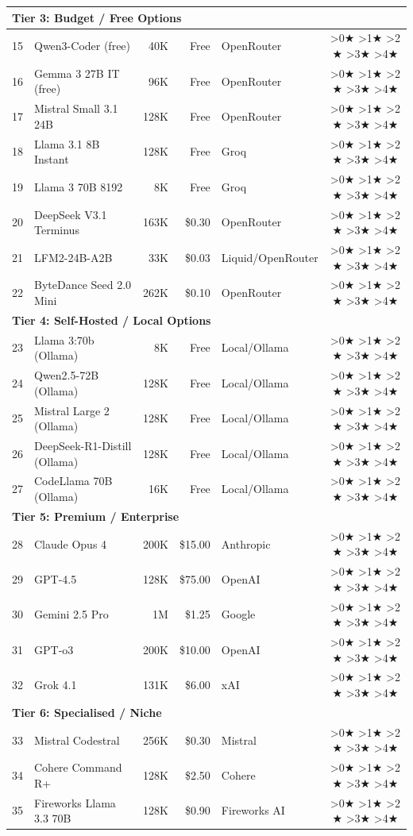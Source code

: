 \documentclass[12pt,a4paper]{report}
\newcommand{\stars}[1]{%
  \ifnum#1>0\relax\ensuremath{\bigstar}\fi%
  \ifnum#1>1\relax\ensuremath{\bigstar}\fi%
  \ifnum#1>2\relax\ensuremath{\bigstar}\fi%
  \ifnum#1>3\relax\ensuremath{\bigstar}\fi%
  \ifnum#1>4\relax\ensuremath{\bigstar}\fi%
}
\begin{document}
\begin{longtable}{rlrrp{3cm}c}
\multicolumn{6}{l}{\textbf{Tier 3: Budget / Free Options}} \\
\midrule
15 & Qwen3-Coder (free)         & 40K    & Free    & OpenRouter       & \stars{3} \\
16 & Gemma 3 27B IT (free)      & 96K    & Free    & OpenRouter       & \stars{3} \\
17 & Mistral Small 3.1 24B      & 128K   & Free    & OpenRouter       & \stars{3} \\
18 & Llama 3.1 8B Instant       & 128K   & Free    & Groq             & \stars{2} \\
19 & Llama 3 70B 8192           & 8K     & Free    & Groq             & \stars{2} \\
20 & DeepSeek V3.1 Terminus     & 163K   & \$0.30  & OpenRouter       & \stars{3} \\
21 & LFM2-24B-A2B               & 33K    & \$0.03  & Liquid/OpenRouter& \stars{2} \\
22 & ByteDance Seed 2.0 Mini    & 262K   & \$0.10  & OpenRouter       & \stars{3} \\
\midrule

\multicolumn{6}{l}{\textbf{Tier 4: Self-Hosted / Local Options}} \\
\midrule
23 & Llama 3:70b (Ollama)       & 8K     & Free    & Local/Ollama     & \stars{3} \\
24 & Qwen2.5-72B (Ollama)       & 128K   & Free    & Local/Ollama     & \stars{3} \\
25 & Mistral Large 2 (Ollama)   & 128K   & Free    & Local/Ollama     & \stars{3} \\
26 & DeepSeek-R1-Distill (Ollama) & 128K & Free    & Local/Ollama     & \stars{3} \\
27 & CodeLlama 70B (Ollama)     & 16K    & Free    & Local/Ollama     & \stars{2} \\
\midrule

\multicolumn{6}{l}{\textbf{Tier 5: Premium / Enterprise}} \\
\midrule
28 & Claude Opus 4              & 200K   & \$15.00 & Anthropic        & \stars{5} \\
29 & GPT-4.5                    & 128K   & \$75.00 & OpenAI           & \stars{4} \\
30 & Gemini 2.5 Pro             & 1M     & \$1.25  & Google           & \stars{5} \\
31 & GPT-o3                     & 200K   & \$10.00 & OpenAI           & \stars{4} \\
32 & Grok 4.1                   & 131K   & \$6.00  & xAI              & \stars{4} \\
\midrule

\multicolumn{6}{l}{\textbf{Tier 6: Specialised / Niche}} \\
\midrule
33 & Mistral Codestral          & 256K   & \$0.30  & Mistral          & \stars{3} \\
34 & Cohere Command R+          & 128K   & \$2.50  & Cohere           & \stars{3} \\
35 & Fireworks Llama 3.3 70B    & 128K   & \$0.90  & Fireworks AI     & \stars{3} \\
\end{longtable}
\end{document}
